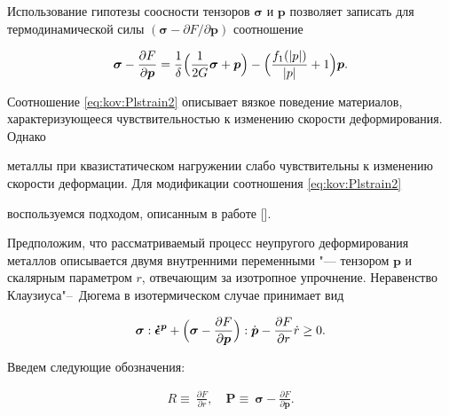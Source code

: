 Использование гипотезы соосности тензоров $\boldsymbol{\sigma}$ и $\boldsymbol{p}$ позволяет записать для термодинамической силы $(\boldsymbol{\sigma}-{\partial F}/{\partial{\boldsymbol{p}}})$ соотношение

\begin{equation}

\boldsymbol{\sigma}-\frac{\partial F}{\partial{\boldsymbol{p}}}=\frac{1}{\delta} 

\Bigl(\frac{1}{2G}\boldsymbol{\sigma}+\boldsymbol{p}\Bigr)-\Bigl(\frac{f_{1}( |  p  | )}{ |  p  | }+1\Bigr)\boldsymbol{p}. \label{eq:kov:Approxim}

\end{equation}



\smallskip




Соотношение  \eqref{eq:kov:Plstrain2} описывает вязкое поведение материалов, характеризующееся чувствительностью к изменению скорости деформирования. Однако

металлы при квазистатическом нагружении слабо чувствительны к изменению скорости деформации. Для модификации соотношения  \eqref{eq:kov:Plstrain2}

воспользуемся подходом, описанным в работе [].



Предположим, что рассматриваемый процесс неупругого деформирования металлов описывается двумя внутренними переменными "---  тензором $\boldsymbol{p}$  и скалярным параметром $r$, отвечающим за изотропное упрочнение.  Неравенство Клаузиуса"--~Дюгема в изотермическом случае принимает вид

$$

\boldsymbol{\sigma}:\boldsymbol{\dot{\epsilon}^{p}}+

\Bigl(\boldsymbol{\sigma}-\frac{\partial F}{\partial{\boldsymbol{p}}}\Bigr):\dot{\boldsymbol{p}}-\frac{\partial F}{\partial{r}}\dot{r}\geq0.

$$

Введем следующие обозначения:

\begin{gather*}

R\equiv\ \frac{\partial F}{\partial{r}},\quad 

\boldsymbol{P} \equiv\ \boldsymbol{\sigma}-\frac{\partial F}{\partial{\boldsymbol{p}}}.

\end{gather*}

